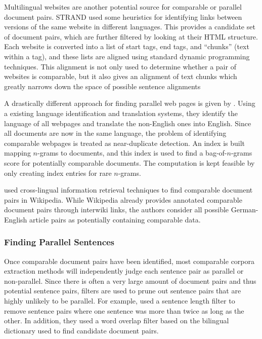 Multilingual websites are another potential source for comparable or parallel
document pairs. STRAND \citep{Resnik03} used some heuristics for identifying
links between versions of the same website in different languages. This provides
a candidate set of document pairs, which are further filtered by looking at
their HTML structure. Each website is converted into a list of start tags, end
tags, and ``chunks'' (text within a tag), and these lists are aligned using
standard dynamic programming techniques. This alignment is not only used to
determine whether a pair of websites is comparable, but it also gives an
alignment of text chunks which greatly narrows down the space of possible
sentence alignments

A drastically different approach for finding parallel web pages is given by 
\citet{Uszkoreit10}. Using a existing language identification and translation
systems, they identify the language of all webpages and translate the
non-English ones into English. Since all documents are now in the same language,
the problem of identifying comparable webpages is treated as near-duplicate
detection. An index is built mapping $n$-grams to documents, and this index is
used to find a bag-of-$n$-grams score for potentially comparable documents. The
computation is kept feasible by only creating index entries for rare $n$-grams.

\citet{Ture12} used cross-lingual information retrieval techniques to find
comparable document pairs in Wikipedia. While Wikipedia already provides
annotated comparable document pairs through interwiki links, the authors
consider all possible German-English article pairs as potentially containing
comparable data.

\subsubsection{Finding Parallel Sentences}
Once comparable document pairs have been identified, most comparable corpora
extraction methods will independently judge each sentence pair as parallel or
non-parallel. Since there is often a very large amount of document pairs and
thus potential sentence pairs, filters are used to prune out sentence pairs that
are highly unlikely to be parallel. For example, \citet{Munteanu05} used a
sentence length filter to remove sentence pairs where one sentence was more than
twice as long as the other. In addition, they used a word overlap filter based
on the bilingual dictionary used to find candidate document pairs.

